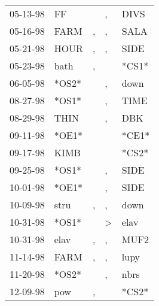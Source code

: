 \begin{supertabular}{p{0.07\textwidth}p{0.06\textwidth}p{0.02\textwidth}p{0.02\textwidth}p{0.06\textwidth}}
 05-13-98\textsuperscript{} &    FF\textsuperscript{} &               &             , &  DIVS\textsuperscript{} \\
 05-16-98\textsuperscript{} &  FARM\textsuperscript{} &             , &             , &  SALA\textsuperscript{} \\
 05-21-98\textsuperscript{} &  HOUR\textsuperscript{} &             , &             , &  SIDE\textsuperscript{} \\
 05-23-98\textsuperscript{} &  bath\textsuperscript{} &             , &               &                   *CS1* \\
 06-05-98\textsuperscript{} &                   *OS2* &               &             , &  down\textsuperscript{} \\
 08-27-98\textsuperscript{} &                   *OS1* &               &             , &  TIME\textsuperscript{} \\
 08-29-98\textsuperscript{} &  THIN\textsuperscript{} &               &             , &   DBK\textsuperscript{} \\
 09-11-98\textsuperscript{} &                   *OE1* &               &               &                   *CE1* \\
 09-17-98\textsuperscript{} &  KIMB\textsuperscript{} &               &               &                   *CS2* \\
 09-25-98\textsuperscript{} &                   *OS1* &               &             , &  SIDE\textsuperscript{} \\
 10-01-98\textsuperscript{} &                   *OE1* &               &             , &  SIDE\textsuperscript{} \\
 10-09-98\textsuperscript{} &  stru\textsuperscript{} &             , &             , &  down\textsuperscript{} \\
 10-31-98\textsuperscript{} &                   *OS1* &               &  \textgreater &  elav\textsuperscript{} \\
 10-31-98\textsuperscript{} &  elav\textsuperscript{} &             , &             , &  MUF2\textsuperscript{} \\
 11-14-98\textsuperscript{} &  FARM\textsuperscript{} &             , &             , &  lupy\textsuperscript{} \\
 11-20-98\textsuperscript{} &                   *OS2* &               &             , &  nbrs\textsuperscript{} \\
 12-09-98\textsuperscript{} &   pow\textsuperscript{} &             , &               &                   *CS2* \\

\end{supertabular}
